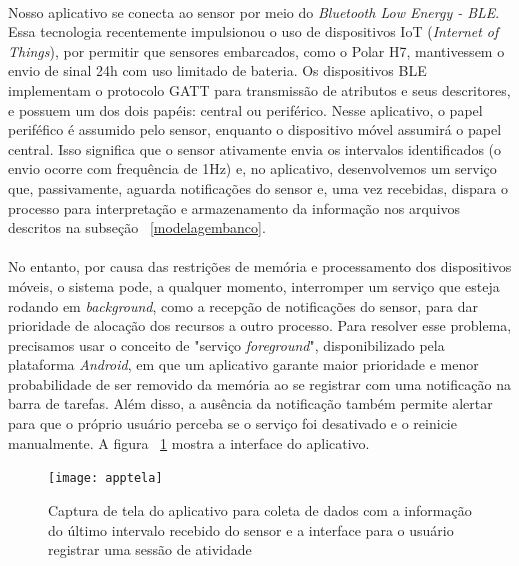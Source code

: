             
            \paragraph{} Nosso aplicativo se conecta ao sensor por meio do \textit{Bluetooth Low Energy - BLE}. Essa tecnologia recentemente impulsionou o uso de dispositivos IoT (\textit{Internet of Things}), por permitir que sensores embarcados, como o Polar H7, mantivessem o envio de sinal 24h com uso limitado de bateria.  Os dispositivos BLE implementam o protocolo GATT para transmissão de atributos e seus descritores, e possuem um dos dois papéis: central ou periférico. Nesse aplicativo, o papel periféfico é assumido pelo sensor, enquanto o dispositivo móvel assumirá o papel central. Isso significa que o sensor ativamente envia os intervalos identificados (o envio ocorre com frequência de 1Hz) e, no aplicativo, desenvolvemos um serviço que, passivamente, aguarda notificações do sensor e, uma vez recebidas, dispara o processo para interpretação e armazenamento da informação nos arquivos descritos na subseção ~\ref{modelagembanco}.
            
            \paragraph{} No entanto, por causa das restrições de memória e processamento dos dispositivos móveis, o sistema pode, a qualquer momento, interromper um serviço que esteja rodando em \textit{background}, como a recepção de notificações do sensor, para dar prioridade de alocação dos recursos a outro processo. Para resolver esse problema, precisamos usar o conceito de "serviço \textit{foreground}", disponibilizado pela plataforma \textit{Android}, em que um aplicativo garante maior prioridade e menor probabilidade de ser removido da memória ao se registrar com uma notificação na barra de tarefas. Além disso, a ausência da notificação também permite alertar para que o próprio usuário perceba se o serviço foi desativado e o reinicie manualmente. A figura ~\ref{apptela} mostra a interface do aplicativo. 
            
            \begin{figure}[h!]
            	\centering
            	\texttt{[image: apptela]}
            	\caption{Captura de tela do aplicativo para coleta de dados com a informação do último intervalo recebido do sensor e a interface para o usuário registrar uma sessão de atividade}
                \label{apptela}
            \end{figure}
            
